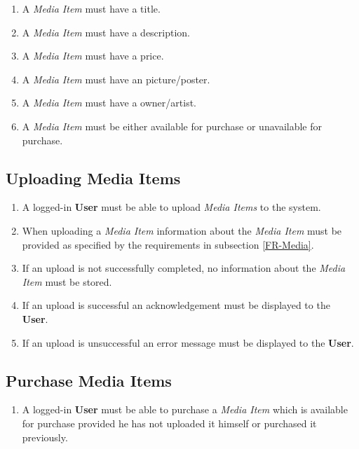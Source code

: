 \begin{enumerate}[label=FR-\twodigits*, resume]
	\item A \textit{Media Item} must have a title.
	\item A \textit{Media Item} must have a description.
	\item A \textit{Media Item} must have a price.
	\item A \textit{Media Item} must have an picture/poster.
	\item A \textit{Media Item} must have a owner/artist.
	\item A \textit{Media Item} must be either available for purchase or unavailable for purchase.
\end{enumerate}

\subsection {Uploading Media Items}

\begin{enumerate}[label=FR-\twodigits*, resume]
	\item A logged-in \textbf{User} must be able to upload \textit{Media Items} to the system.
	\item When uploading a \textit{Media Item} information about the \textit{Media Item} must be provided as specified by the requirements in subsection \ref{FR-Media}.
	\item If an upload is not successfully completed, no information about the \textit{Media Item} must be stored.
	\item If an upload is successful an acknowledgement must be displayed to the \textbf{User}.
	\item If an upload is unsuccessful an error message must be displayed to the \textbf{User}. 
\end{enumerate}

\subsection {Purchase Media Items}

\begin{enumerate}[label=FR-\twodigits*, resume]
	\item A logged-in \textbf{User} must be able to purchase a \textit{Media Item} which is available for purchase provided he has not uploaded it himself or  purchased it previously.
\end{enumerate}

